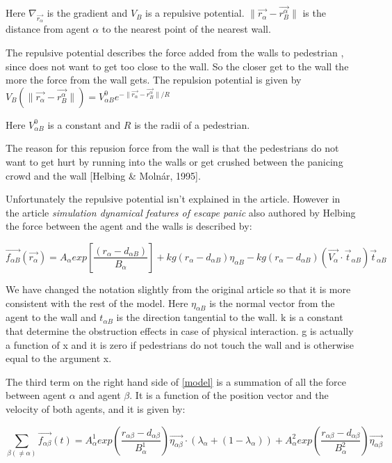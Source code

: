 Here $\nabla_{\vec{r_{\alpha}}}$ is the gradient and $V_B$ is a repulsive 
potential. $ \| \vec{r_{\alpha}} - \vec{r_{B}^{\alpha}} \|$ is the distance 
from agent $\alpha$ to the nearest point of the nearest wall.

The repulsive potential describes the force added from the walls to pedestrian \alpha, since \alpha does not
want to get too close to the wall. So the closer \alpha get to the wall the more the force from the wall gets.
The repulsion potential is given by  $V_{B} \left( \| \vec{r_{\alpha}} - \vec{r_{B}^{\alpha}} \| \right) =
V^0_{\alpha B} e^{- \| \vec{r_{\alpha}} - \vec{r_{B}^{\alpha}} \| / R }$

Here $V^0_{\alpha B}$ is a constant and $R$ is the radii of a pedestrian.

The reason for this repusion force from the wall is that the pedestrians do not want to get hurt by running into the walls
or get crushed between the panicing crowd and the wall [Helbing & Molnár, 1995]. 

Unfortunately the repulsive potential isn't explained in the article. However
in the article \emph{simulation dynamical features of escape panic} also authored
by Helbing the force between the agent and the walls is described by:

\begin{equation}
	\vec{f_{\alpha B}} \left( \vec{r_{\alpha}} \right) =
	A_{\alpha} exp \left[ \frac{\left( r_{\alpha} - d_{\alpha B}   \right)}{B_{\alpha}} \right] + 
	kg \left( r_{\alpha} - d_{\alpha B} \right) \eta_{\alpha B} -
	kg \left( r_{\alpha} - d_{\alpha B} \right) \left( \vec{V_{\alpha}} \cdot \vec{t}_{\alpha B} \right)
	\vec{t}_{\alpha B}
\end{equation} 

We have changed the notation slightly from the original article so that it is more
consistent with the rest of the model. Here $\eta_{\alpha B}$ is the normal vector
from the agent to the wall and $t_{\alpha B}$ is the direction tangential to the wall.
k is a constant that determine the obstruction effects in case of physical interaction.
g is actually a function of x and it is zero if pedestrians do not touch the wall
and is otherwise equal to the argument x.

The third term on the right hand side of \eqref{model} is a summation of all the 
force between agent $\alpha$ and agent $\beta$. It is a function of the position vector and the velocity of 
both agents, and it is given by:

\begin{equation}
    \sum_{\beta \left( \neq \alpha \right)}
        \vec{f_{\alpha \beta }}\left( t \right) =
        A_{\alpha}^{1} exp \left(
            \frac{ r_{\alpha \beta} - d_{\alpha \beta }}
                 {B_{\alpha}^1}
        \right)
    \vec{\eta_{\alpha \beta}} \cdot
    \left(
        \lambda_{\alpha} + \left(
            1 - \lambda_{\alpha}
        \right)
    \right) +
    A_{\alpha}^{2} exp\left(
        \frac{r_{\alpha \beta} - d_{\alpha \beta}}
             {B_{\alpha}^{2}}
    \right)
    \vec{\eta_{\alpha \beta}}
    \label{agentinteraction}
\end{equation}

